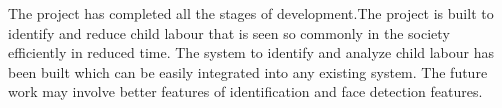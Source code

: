 The project has completed all the stages of development.The project is built to identify and reduce child labour that is seen so commonly in the society efficiently in reduced time.
The system to identify and analyze child labour has been built which can be easily integrated into
any existing system.
The future work may involve better features of identification and face detection features.